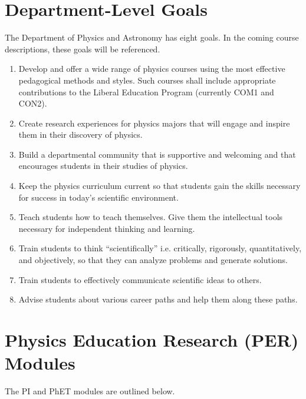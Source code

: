 \documentclass[../../../main.tex]{subfiles}
\begin{document}
\section{Department-Level Goals}

The Department of Physics and Astronomy has eight goals. In the coming course descriptions, these goals will be referenced.
\begin{enumerate}
\item Develop and offer a wide range of physics courses using the most effective pedagogical methods and styles.  Such courses shall include appropriate contributions to the Liberal Education Program (currently COM1 and CON2).
\item Create research experiences for physics majors that will engage and inspire them in their discovery of physics.
\item Build a departmental community that is supportive and welcoming and that encourages students in their studies of physics.
\item Keep the physics curriculum current so that students gain the skills necessary for success in today's scientific environment.
\item Teach students how to teach themselves. Give them the intellectual tools necessary for independent thinking and learning.
\item Train students to think ``scientifically'' i.e. critically, rigorously, quantitatively, and objectively, so that they can analyze problems and generate solutions.
\item Train students to effectively communicate scientific ideas to others.
\item Advise students about various career paths and help them along these paths.
\end{enumerate}

\section{Physics Education Research (PER) Modules}
\label{sec:per}

The PI and PhET modules are outlined below.
\\
\vspace{0.15cm}
\end{document}
